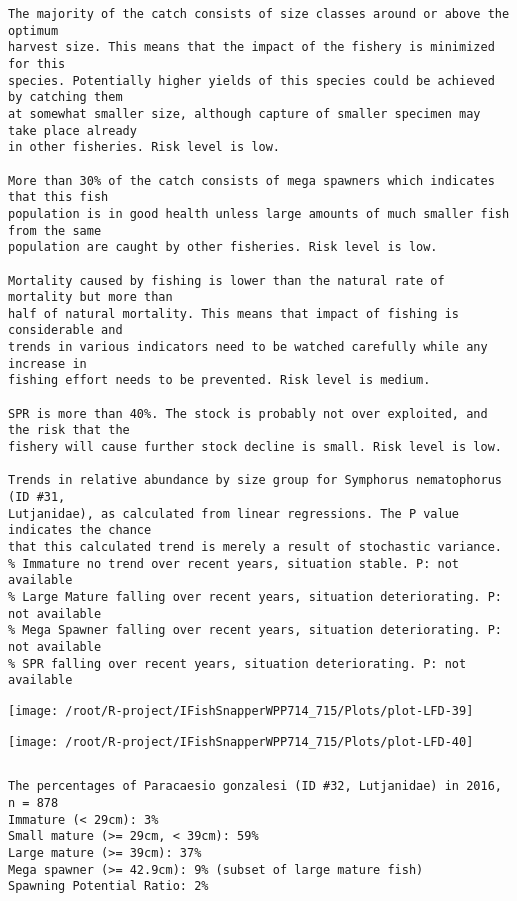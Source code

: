 \documentclass{report}\usepackage[]{graphicx}\usepackage[]{color}
\makeatletter
\def\maxwidth{ %
  \ifdim\Gin@nat@width>\linewidth
    \linewidth
  \else
    \Gin@nat@width
  \fi
}
\newenvironment{kframe}{%
 \def\at@end@of@kframe{}%
 \ifinner\ifhmode%
  \def\at@end@of@kframe{\end{minipage}}%
  \begin{minipage}{\columnwidth}%
 \fi\fi%
 \def\FrameCommand##1{\hskip\@totalleftmargin \hskip-\fboxsep
 \colorbox{shadecolor}{##1}\hskip-\fboxsep
     \hskip-\linewidth \hskip-\@totalleftmargin \hskip\columnwidth}%
 \MakeFramed {\advance\hsize-\width
   \@totalleftmargin\z@ \linewidth\hsize
   \@setminipage}}%
 {\par\unskip\endMakeFramed%
 \at@end@of@kframe}
\newenvironment{knitrout}{}{} %
\makeatother
\begin{document}
\begin{knitrout}
\begin{kframe}
\begin{verbatim}
The majority of the catch consists of size classes around or above the optimum
harvest size. This means that the impact of the fishery is minimized for this
species. Potentially higher yields of this species could be achieved by catching them
at somewhat smaller size, although capture of smaller specimen may take place already
in other fisheries. Risk level is low.

More than 30% of the catch consists of mega spawners which indicates that this fish
population is in good health unless large amounts of much smaller fish from the same
population are caught by other fisheries. Risk level is low.
 
Mortality caused by fishing is lower than the natural rate of mortality but more than
half of natural mortality. This means that impact of fishing is considerable and
trends in various indicators need to be watched carefully while any increase in
fishing effort needs to be prevented. Risk level is medium.
 
SPR is more than 40%. The stock is probably not over exploited, and the risk that the
fishery will cause further stock decline is small. Risk level is low.
 
Trends in relative abundance by size group for Symphorus nematophorus (ID #31,
Lutjanidae), as calculated from linear regressions. The P value indicates the chance
that this calculated trend is merely a result of stochastic variance.
% Immature no trend over recent years, situation stable. P: not available
% Large Mature falling over recent years, situation deteriorating. P: not available
% Mega Spawner falling over recent years, situation deteriorating. P: not available
% SPR falling over recent years, situation deteriorating. P: not available
\end{verbatim}
\end{kframe}
\texttt{[image: /root/R-project/IFishSnapperWPP714\_715/Plots/plot-LFD-39]} 

\texttt{[image: /root/R-project/IFishSnapperWPP714\_715/Plots/plot-LFD-40]} 
\begin{kframe}\begin{verbatim}
\end{verbatim}
\end{kframe}
\clearpage
\newpage
\begin{kframe}\begin{verbatim}The percentages of Paracaesio gonzalesi (ID #32, Lutjanidae) in 2016, n = 878
Immature (< 29cm): 3%
Small mature (>= 29cm, < 39cm): 59%
Large mature (>= 39cm): 37%
Mega spawner (>= 42.9cm): 9% (subset of large mature fish)
Spawning Potential Ratio: 2%
 

\end{verbatim}
\end{kframe}
\end{knitrout}
\end{document}
